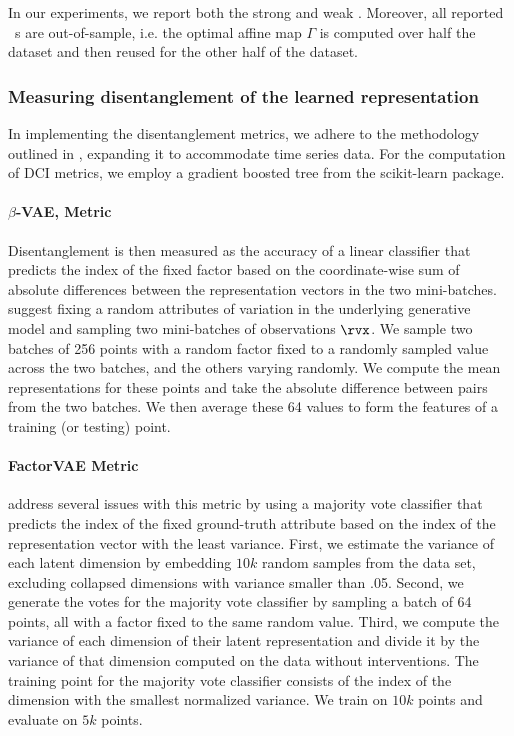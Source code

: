 \documentclass{article} %
\theoremstyle{plain}
\theoremstyle{definition}
\theoremstyle{remark}
\numberwithin{equation}{section}
\begin{document}
In our experiments, we report both the strong \MCC and weak \MCC. Moreover, all reported \MCC~s are out-of-sample, i.e. the optimal affine map $\Gamma$ is computed over half the dataset and then reused for the other half of the dataset.


\subsubsection{Measuring disentanglement of the learned representation}
In implementing the disentanglement metrics, we adhere to the methodology outlined in \citep{locatello2019challenging}, expanding it to accommodate time series data. For the computation of DCI metrics, we employ a gradient boosted tree from the scikit-learn package.




\paragraph{$\beta$-VAE,  Metric}
Disentanglement is then measured as the accuracy of a linear classifier that predicts the index of the fixed factor based on the coordinate-wise sum of absolute differences between the representation vectors in the two mini-batches.  \citep{higgins_beta-vae_2016} suggest fixing a random attributes of variation in the underlying generative model and sampling two mini-batches of observations $\rvx$. We sample two batches of 256 points with a random factor fixed to a randomly sampled value across the two batches, and the others varying randomly. We compute the mean representations for these points and take the absolute difference between pairs from the two batches. We then average these 64 values to form the features of a training (or testing) point.

\paragraph{FactorVAE Metric~\citep{kim_disentangling_2019}}

\citep{kim_disentangling_2019} address several issues with this metric by using a majority vote classifier that predicts the index of the fixed ground-truth attribute based on the index of the representation vector with the least variance. First, we estimate the variance of each latent dimension by embedding $10k$ random samples from the data set, excluding collapsed dimensions with variance smaller than .05. Second, we generate the votes for the majority vote classifier by sampling a batch of 64 points, all with a factor fixed to the same random value. Third, we compute the variance of each dimension of their latent representation and divide it by the variance of that dimension computed on the data without interventions. The training point for the majority vote classifier consists of the index of the dimension with the smallest normalized variance. We train on $10k$ points and evaluate on $5k$ points.
\end{document}
